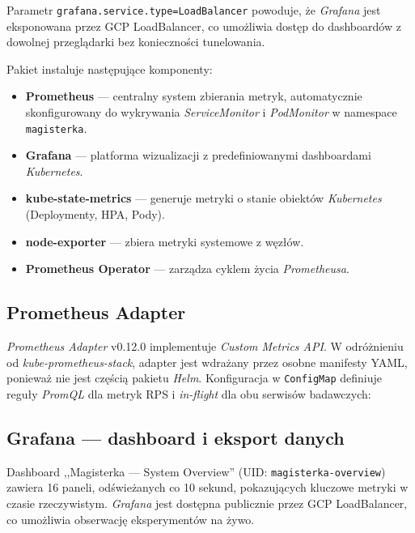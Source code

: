 Parametr \texttt{grafana.service.type=LoadBalancer} powoduje, że \textit{Grafana} jest eksponowana przez GCP LoadBalancer, co umożliwia dostęp do dashboardów z dowolnej przeglądarki bez konieczności tunelowania.

Pakiet instaluje następujące komponenty:
\begin{itemize}
  \item \textbf{Prometheus} — centralny system zbierania metryk, automatycznie skonfigurowany do wykrywania \textit{ServiceMonitor} i \textit{PodMonitor} w namespace \texttt{magisterka}.
  \item \textbf{Grafana} — platforma wizualizacji z predefiniowanymi dashboardami \textit{Kubernetes}.
  \item \textbf{kube-state-metrics} — generuje metryki o stanie obiektów \textit{Kubernetes} (Deploymenty, HPA, Pody).
  \item \textbf{node-exporter} — zbiera metryki systemowe z węzłów.
  \item \textbf{Prometheus Operator} — zarządza cyklem życia \textit{Prometheusa}.
\end{itemize}

\subsection{Prometheus Adapter}

\textit{Prometheus Adapter} v0.12.0 implementuje \textit{Custom Metrics API}. W odróżnieniu od \textit{kube-prometheus-stack}, adapter jest wdrażany przez osobne manifesty YAML, ponieważ nie jest częścią pakietu \textit{Helm}. Konfiguracja w \texttt{ConfigMap} definiuje reguły \textit{PromQL} dla metryk RPS i \textit{in-flight} dla obu serwisów badawczych:



\subsection{Grafana — dashboard i eksport danych}

Dashboard ,,Magisterka — System Overview'' (UID: \texttt{magisterka-overview}) zawiera 16 paneli, odświeżanych co 10 sekund, pokazujących kluczowe metryki w czasie rzeczywistym. \textit{Grafana} jest dostępna publicznie przez GCP LoadBalancer, co umożliwia obserwację eksperymentów na żywo.

